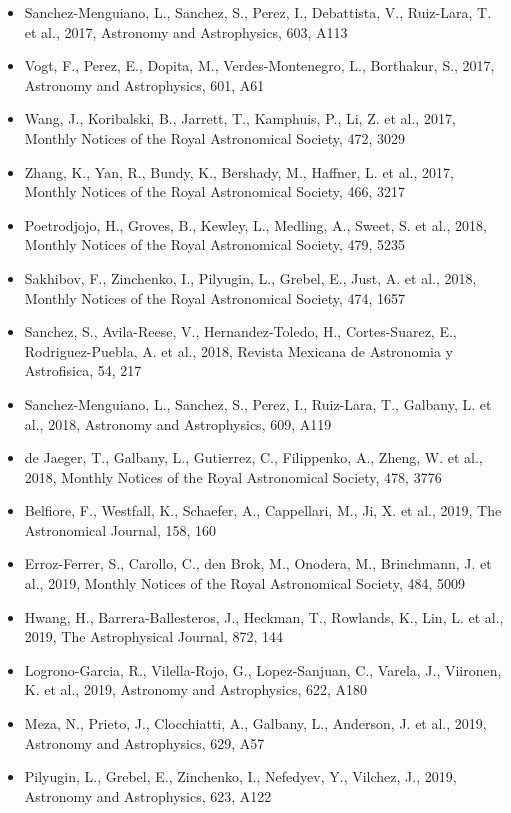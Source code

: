 \documentclass{letter}
\begin{document}
\begin{enumerate}
\begin{itemize}
\item Sanchez-Menguiano, L., Sanchez, S., Perez, I., Debattista, V., Ruiz-Lara, T. et al., 2017, Astronomy and Astrophysics, 603, A113
\item Vogt, F., Perez, E., Dopita, M., Verdes-Montenegro, L., Borthakur, S., 2017, Astronomy and Astrophysics, 601, A61
\item Wang, J., Koribalski, B., Jarrett, T., Kamphuis, P., Li, Z. et al., 2017, Monthly Notices of the Royal Astronomical Society, 472, 3029
\item Zhang, K., Yan, R., Bundy, K., Bershady, M., Haffner, L. et al., 2017, Monthly Notices of the Royal Astronomical Society, 466, 3217
\item Poetrodjojo, H., Groves, B., Kewley, L., Medling, A., Sweet, S. et al., 2018, Monthly Notices of the Royal Astronomical Society, 479, 5235
\item Sakhibov, F., Zinchenko, I., Pilyugin, L., Grebel, E., Just, A. et al., 2018, Monthly Notices of the Royal Astronomical Society, 474, 1657
\item Sanchez, S., Avila-Reese, V., Hernandez-Toledo, H., Cortes-Suarez, E., Rodriguez-Puebla, A. et al., 2018, Revista Mexicana de Astronomia y Astrofisica, 54, 217
\item Sanchez-Menguiano, L., Sanchez, S., Perez, I., Ruiz-Lara, T., Galbany, L. et al., 2018, Astronomy and Astrophysics, 609, A119
\item de Jaeger, T., Galbany, L., Gutierrez, C., Filippenko, A., Zheng, W. et al., 2018, Monthly Notices of the Royal Astronomical Society, 478, 3776
\item Belfiore, F., Westfall, K., Schaefer, A., Cappellari, M., Ji, X. et al., 2019, The Astronomical Journal, 158, 160
\item Erroz-Ferrer, S., Carollo, C., den Brok, M., Onodera, M., Brinchmann, J. et al., 2019, Monthly Notices of the Royal Astronomical Society, 484, 5009
\item Hwang, H., Barrera-Ballesteros, J., Heckman, T., Rowlands, K., Lin, L. et al., 2019, The Astrophysical Journal, 872, 144
\item Logrono-Garcia, R., Vilella-Rojo, G., Lopez-Sanjuan, C., Varela, J., Viironen, K. et al., 2019, Astronomy and Astrophysics, 622, A180
\item Meza, N., Prieto, J., Clocchiatti, A., Galbany, L., Anderson, J. et al., 2019, Astronomy and Astrophysics, 629, A57
\item Pilyugin, L., Grebel, E., Zinchenko, I., Nefedyev, Y., Vilchez, J., 2019, Astronomy and Astrophysics, 623, A122

\end{itemize}
\end{enumerate}
\end{document}
